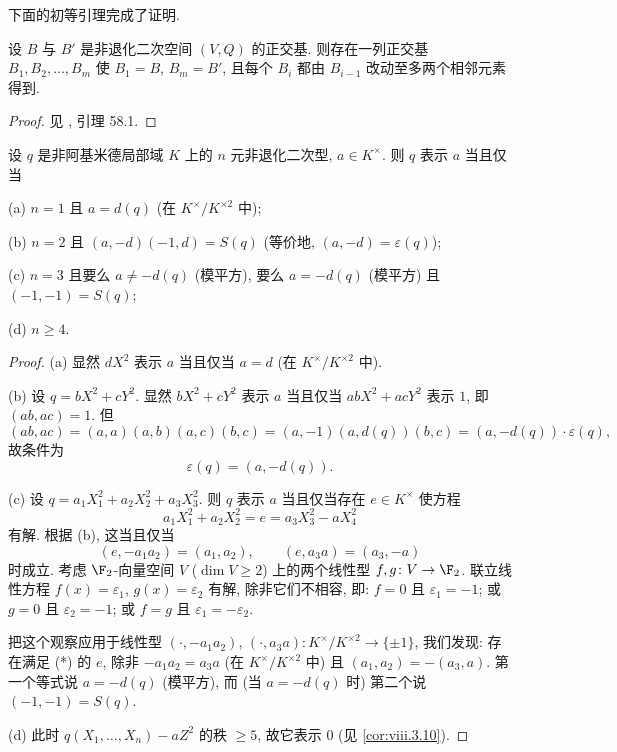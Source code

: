 下面的初等引理完成了证明.

\begin{lemma}\label{lem:viii.6.8}
设 $B$ 与 $B'$ 是非退化二次空间 $(V,Q)$ 的正交基. 则存在一列正交基 $B_1,B_2,\ldots,B_m$ 使 $B_1=B$, $B_m=B'$, 且每个 $B_i$ 都由 $B_{i-1}$ 改动至多两个相邻元素得到.
\end{lemma}

\begin{proof}
见 \cite{OMeara1963}, 引理 58.1.
\end{proof}

\begin{proposition}\label{prop:viii.6.9}
设 $q$ 是非阿基米德局部域 $K$ 上的 $n$ 元非退化二次型, $a\in K^{\times}$. 则 $q$ 表示 $a$ 当且仅当

(a) $n=1$ 且 $a=d(q)$ (在 $K^{\times}/K^{\times 2}$ 中);

(b) $n=2$ 且 $(a,-d)(-1,d)=S(q)$ (等价地, $(a,-d)=\varepsilon(q)$);

(c) $n=3$ 且要么 $a\ne -d(q)$ (模平方), 要么 $a=-d(q)$ (模平方) 且 $(-1,-1)=S(q)$;

(d) $n\ge 4$.
\end{proposition}

\begin{proof}
(a) 显然 $dX^{2}$ 表示 $a$ 当且仅当 $a=d$ (在 $K^{\times}/K^{\times 2}$ 中).

(b) 设 $q=bX^{2}+cY^{2}$. 显然 $bX^{2}+cY^{2}$ 表示 $a$ 当且仅当 $abX^{2}+acY^{2}$ 表示 $1$, 即 $(ab,ac)=1$. 但
\[
(ab,ac)=(a,a)(a,b)(a,c)(b,c)=(a,-1)(a,d(q))(b,c)=(a,-d(q))\cdot\varepsilon(q),
\]
故条件为
\[
\varepsilon(q)=(a,-d(q)).
\]

(c) 设 $q=a_1X_1^{2}+a_2X_2^{2}+a_3X_3^{2}$. 则 $q$ 表示 $a$ 当且仅当存在 $e\in K^{\times}$ 使方程
\[
a_{1}X_{1}^{2}+a_{2}X_{2}^{2}=e=a_{3}X_{3}^{2}-aX_{4}^{2}
\]
有解. 根据 (b), 这当且仅当
\begin{equation*}
(e,-a_{1}a_{2})=(a_{1},a_{2}),\qquad (e,a_{3}a)=(a_{3},-a)
\tag{$*$}
\end{equation*}
时成立. 考虑 $\F_2$-向量空间 $V$ ($\dim V\ge 2$) 上的两个线性型 $f,g\colon V\to\F_2$. 联立线性方程 $f(x)=\varepsilon_1$, $g(x)=\varepsilon_2$ 有解, 除非它们不相容, 即: $f=0$ 且 $\varepsilon_1=-1$; 或 $g=0$ 且 $\varepsilon_2=-1$; 或 $f=g$ 且 $\varepsilon_1=-\varepsilon_2$.

把这个观察应用于线性型 $(\cdot,-a_1a_2)$, $(\cdot,a_3a)\colon K^{\times}/K^{\times 2}\to\{\pm 1\}$, 我们发现: 存在满足 (*) 的 $e$, 除非 $-a_1a_2=a_3a$ (在 $K^{\times}/K^{\times 2}$ 中) 且 $(a_1,a_2)=-(a_3,a)$. 第一个等式说 $a=-d(q)$ (模平方), 而 (当 $a=-d(q)$ 时) 第二个说 $(-1,-1)=S(q)$.

(d) 此时 $q(X_1,\ldots,X_n)-aZ^{2}$ 的秩 $\ge 5$, 故它表示 $0$ (见 \ref{cor:viii.3.10}).
\end{proof}

